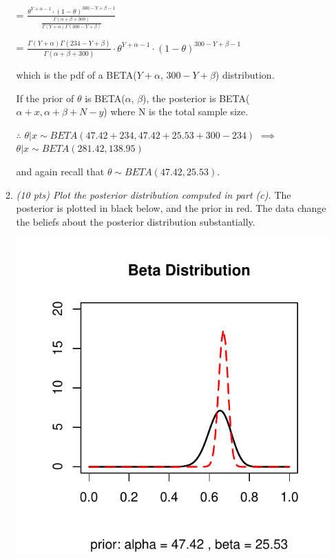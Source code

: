 \documentclass{article}\usepackage[]{graphicx}\usepackage[]{color}
\makeatletter
\def\maxwidth{ %
  \ifdim\Gin@nat@width>\linewidth
    \linewidth
  \else
    \Gin@nat@width
  \fi
}
\newenvironment{knitrout}{}{} %
\makeatother
\begin{document}
\begin{enumerate}
\begin{enumerate}
= $\frac{\theta^{Y+\alpha-1} \cdot (1-\theta)^{300-Y+\beta-1}}{\frac{\Gamma(\alpha+\beta+300)}{\Gamma(Y+\alpha)\Gamma(300-Y+\beta)}}$

= $\frac{\Gamma(Y+\alpha)\Gamma(234-Y+\beta)}{\Gamma(\alpha+\beta+300)} \cdot \theta^{Y+\alpha-1} \cdot (1-\theta)^{300-Y+\beta-1}$

which is the pdf of a BETA($Y+\alpha$, $300-Y+\beta$) distribution.

If the prior of $\theta$ is BETA($\alpha$, $\beta$), the posterior is BETA($\alpha+x, \alpha+\beta+N-y$) where N is the total sample size.

$\therefore$ $\theta|x \sim BETA(47.42+234,47.42+25.53+300-234)$ $\implies$ $\theta|x \sim BETA(281.42,138.95)$

and again recall that $\theta \sim BETA(47.42,25.53)$. 

\item %
{\it (10 pts) Plot the posterior distribution computed in part (c).}
The posterior is plotted in black below, and the prior in red. The data change the beliefs about the posterior distribution substantially.

\begin{center}
\begin{knitrout}
\color{fgcolor}
\includegraphics[width=\maxwidth]{figure/3d-1} 


\end{knitrout}
\end{center}
\end{enumerate}
\end{enumerate}
\end{document}
